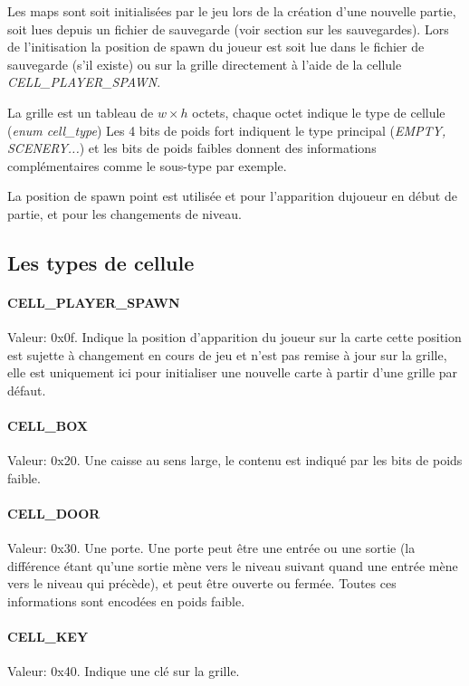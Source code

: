 \documentclass[12pt,a4paper]{article} %
\begin{document}
Les maps sont soit initialisées par le jeu lors de la création d'une nouvelle partie, soit lues depuis un fichier de sauvegarde (voir section sur les sauvegardes). Lors de l'initisation la position de spawn du joueur est soit lue dans le fichier de sauvegarde (s'il existe) ou sur la grille directement à l'aide de la cellule \emph{CELL\_PLAYER\_SPAWN}.

La grille est un tableau de $w \times h$ octets, chaque octet indique le type de cellule (\emph{enum cell\_type})
Les 4 bits de poids fort indiquent le type principal 
(\emph{EMPTY, SCENERY...}) et les bits de poids faibles donnent des informations complémentaires comme le sous-type par exemple.

La position de spawn point est utilisée et pour l'apparition dujoueur en début de partie, et pour les changements de niveau.

\subsection{Les types de cellule}

\paragraph{CELL\_PLAYER\_SPAWN} Valeur: 0x0f. Indique la position d'apparition du joueur sur la carte cette position est sujette à changement en cours de jeu
et n'est pas remise à jour sur la grille, elle est uniquement ici pour initialiser une nouvelle carte à partir d'une grille par défaut.

\paragraph{CELL\_BOX} Valeur: 0x20. Une caisse au sens large, le contenu est indiqué par les bits de poids faible.

\paragraph{CELL\_DOOR} Valeur: 0x30. Une porte. Une porte peut être une entrée ou une sortie (la différence étant qu'une sortie mène vers le niveau suivant quand une entrée mène vers le niveau qui précède), et peut être ouverte ou fermée. Toutes ces informations sont encodées en poids faible.

\paragraph{CELL\_KEY} Valeur: 0x40. Indique une clé sur la grille.
\end{document}
